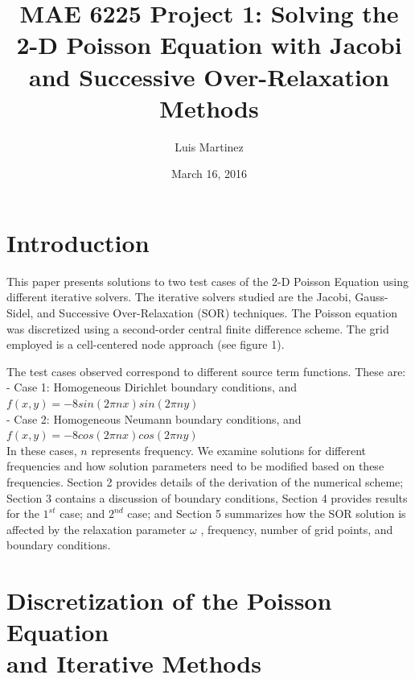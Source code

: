 \documentclass{article}
\begin{document}
\pagestyle{plain}

\title{MAE 6225 Project 1: Solving the 2-D Poisson Equation with Jacobi and Successive Over-Relaxation Methods}
\author{Luis Martinez}
\date{March 16, 2016}
\maketitle

\section{Introduction}


\noindent This paper presents solutions to two test cases of the 2-D Poisson Equation using different iterative solvers. The iterative solvers studied are the Jacobi, Gauss-Sidel, and Successive Over-Relaxation (SOR) techniques. The Poisson equation was discretized using a second-order central finite difference scheme. The grid employed is a cell-centered node approach (see figure 1).

\vspace{1em}

\noindent The test cases observed correspond to different source term functions. These are:\\

\indent  - Case 1: Homogeneous Dirichlet boundary conditions, and $f(x,y) = -8 sin(2 \pi n x ) sin(2 \pi n y )$\\
\indent  - Case 2: Homogeneous Neumann boundary conditions, and $f(x,y) = -8 cos(2 \pi n x ) cos(2 \pi n y)$\\

\noindent In these cases, $n$ represents frequency. We examine solutions for different frequencies and how solution parameters need to be modified based on these frequencies. Section 2 provides details of the derivation of the numerical scheme; Section 3 contains a discussion of boundary conditions, Section 4 provides results for the $1^{st}$ case; and $2^{nd}$ case; and Section 5 summarizes how the SOR solution is affected by the relaxation parameter $\omega$ , frequency, number of grid points, and boundary conditions.

\section{Discretization of the Poisson Equation \\ and Iterative Methods}
\end{document}
